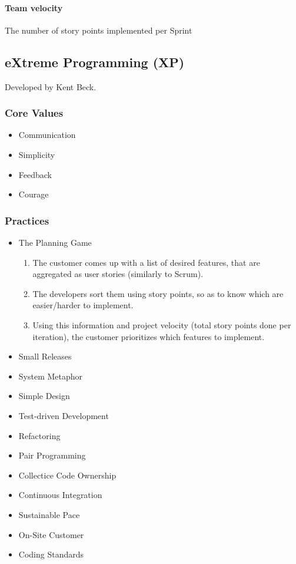 \documentclass[../ESOF_notes.tex]{subfiles}
\begin{document}
\paragraph{Team velocity}

The number of story points implemented per Sprint

\subsection{eXtreme Programming (XP)}

Developed by Kent Beck.

\subsubsection{Core Values}

\begin{itemize}
    \item Communication
    \item Simplicity
    \item Feedback
    \item Courage
\end{itemize}

\subsubsection{Practices}

\begin{itemize}
    \item The Planning Game
    \begin{enumerate}
        \item The customer comes up with a list of desired features, that are aggregated as user stories (similarly to Scrum).
        \item The developers sort them using story points, so as to know which are easier/harder to implement.
        \item Using this information and project velocity (total story points done per iteration), the customer prioritizes which features to implement.
    \end{enumerate}
    
    \item Small Releases
    \item System Metaphor
    \item Simple Design
    \item Test-driven Development
    \item Refactoring
    \item Pair Programming
    \item Collectice Code Ownership
    \item Continuous Integration
    \item Sustainable Pace
    \item On-Site Customer
    \item Coding Standards
\end{itemize}
\end{document}

